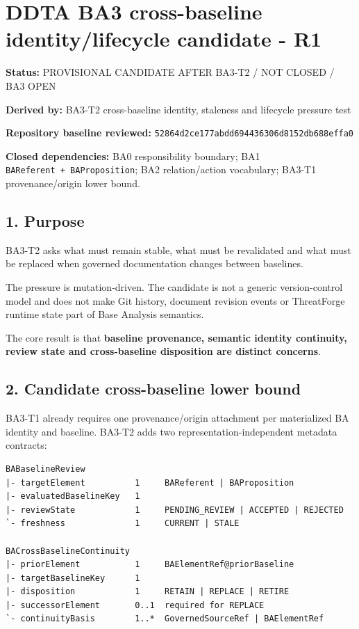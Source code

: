 \documentclass[11pt,a4paper]{article}
\begin{document}
\section{DDTA BA3 cross-baseline identity/lifecycle candidate -
R1}\label{ddta-ba3-cross-baseline-identitylifecycle-candidate---r1}

\textbf{Status:} PROVISIONAL CANDIDATE AFTER BA3-T2 / NOT CLOSED / BA3
OPEN

\textbf{Derived by:} BA3-T2 cross-baseline identity, staleness and
lifecycle pressure test

\textbf{Repository baseline reviewed:}
\texttt{52864d2ce177abdd694436306d8152db688effa0}

\textbf{Closed dependencies:} BA0 responsibility boundary; BA1
\texttt{BAReferent\ +\ BAProposition}; BA2 relation/action vocabulary;
BA3-T1 provenance/origin lower bound.

\subsection{1. Purpose}\label{purpose}

BA3-T2 asks what must remain stable, what must be revalidated and what
must be replaced when governed documentation changes between baselines.

The pressure is mutation-driven. The candidate is not a generic
version-control model and does not make Git history, document revision
events or ThreatForge runtime state part of Base Analysis semantics.

The core result is that \textbf{baseline provenance, semantic identity
continuity, review state and cross-baseline disposition are distinct
concerns}.

\subsection{2. Candidate cross-baseline lower
bound}\label{candidate-cross-baseline-lower-bound}

BA3-T1 already requires one provenance/origin attachment per
materialized BA identity and baseline. BA3-T2 adds two
representation-independent metadata contracts:

\begin{verbatim}
BABaselineReview
|- targetElement          1     BAReferent | BAProposition
|- evaluatedBaselineKey   1
|- reviewState            1     PENDING_REVIEW | ACCEPTED | REJECTED
`- freshness              1     CURRENT | STALE

BACrossBaselineContinuity
|- priorElement           1     BAElementRef@priorBaseline
|- targetBaselineKey      1
|- disposition            1     RETAIN | REPLACE | RETIRE
|- successorElement       0..1  required for REPLACE
`- continuityBasis        1..*  GovernedSourceRef | BAElementRef
\end{verbatim}
\end{document}

